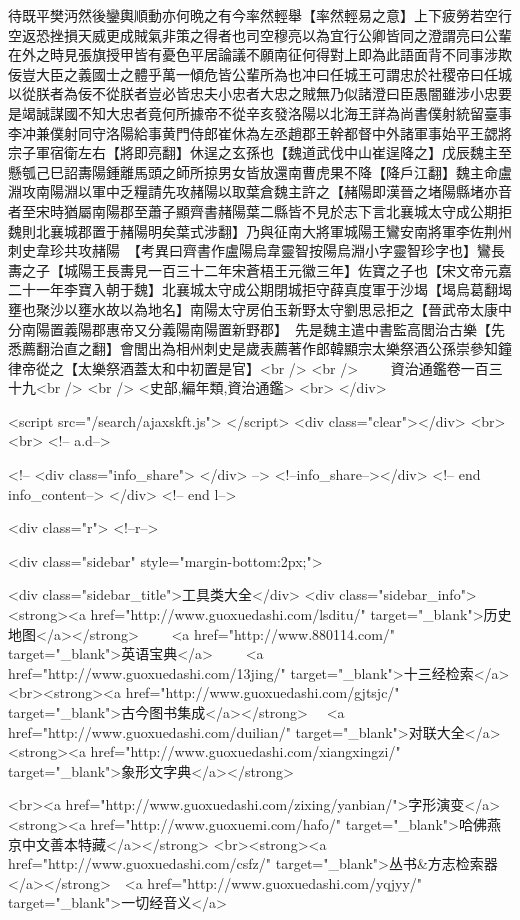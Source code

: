 待既平樊沔然後鑾輿順動亦何晩之有今率然輕舉【率然輕易之意】上下疲勞若空行空返恐挫損天威更成賊氣非策之得者也司空穆亮以為宜行公卿皆同之澄謂亮曰公輩在外之時見張旗授甲皆有憂色平居論議不願南征何得對上即為此語面背不同事涉欺佞豈大臣之義國士之體乎萬一傾危皆公輩所為也冲曰任城王可謂忠於社稷帝曰任城以從朕者為佞不從朕者豈必皆忠夫小忠者大忠之賊無乃似諸澄曰臣愚闇雖涉小忠要是竭誠謀國不知大忠者竟何所據帝不從辛亥發洛陽以北海王詳為尚書僕射統留臺事李冲兼僕射同守洛陽給事黄門侍郎崔休為左丞趙郡王幹都督中外諸軍事始平王勰將宗子軍宿衛左右【將即亮翻】休逞之玄孫也【魏道武伐中山崔逞降之】戊辰魏主至懸瓠己巳詔夀陽鍾離馬頭之師所掠男女皆放還南曹虎果不降【降戶江翻】魏主命盧淵攻南陽淵以軍中乏糧請先攻赭陽以取葉倉魏主許之【赭陽即漢晉之堵陽縣堵亦音者至宋時猶屬南陽郡至蕭子顯齊書赭陽葉二縣皆不見於志下言北襄城太守成公期拒魏則北襄城郡置于赭陽明矣葉式涉翻】乃與征南大將軍城陽王鸞安南將軍李佐荆州刺史韋珍共攻赭陽　【考異曰齊書作盧陽烏韋靈智按陽烏淵小字靈智珍字也】鸞長夀之子【城陽王長夀見一百三十二年宋蒼梧王元徽三年】佐寶之子也【宋文帝元嘉二十一年李寶入朝于魏】北襄城太守成公期閉城拒守薛真度軍于沙堨【堨烏葛翻堨壅也聚沙以壅水故以為地名】南陽太守房伯玉新野太守劉思忌拒之【晉武帝太康中分南陽置義陽郡惠帝又分義陽南陽置新野郡】　先是魏主遣中書監高閭治古樂【先悉薦翻治直之翻】會閭出為相州刺史是歲表薦著作郎韓顯宗太樂祭酒公孫崇參知鐘律帝從之【太樂祭酒蓋太和中初置是官】<br />
<br />
　　資治通鑑卷一百三十九<br />
<br />
<史部,編年類,資治通鑑>  <br>
   </div> 

<script src="/search/ajaxskft.js"> </script>
 <div class="clear"></div>
<br>
<br>
 <!-- a.d-->

 <!--
<div class="info_share">
</div> 
-->
 <!--info_share--></div>   <!-- end info_content-->
  </div> <!-- end l-->

<div class="r">   <!--r-->



<div class="sidebar"  style="margin-bottom:2px;">

 
<div class="sidebar_title">工具类大全</div>
<div class="sidebar_info">
<strong><a href="http://www.guoxuedashi.com/lsditu/" target="_blank">历史地图</a></strong>　　
<a href="http://www.880114.com/" target="_blank">英语宝典</a>　　
<a href="http://www.guoxuedashi.com/13jing/" target="_blank">十三经检索</a>　
<br><strong><a href="http://www.guoxuedashi.com/gjtsjc/" target="_blank">古今图书集成</a></strong>　
<a href="http://www.guoxuedashi.com/duilian/" target="_blank">对联大全</a>　<strong><a href="http://www.guoxuedashi.com/xiangxingzi/" target="_blank">象形文字典</a></strong>　

<br><a href="http://www.guoxuedashi.com/zixing/yanbian/">字形演变</a>　　<strong><a href="http://www.guoxuemi.com/hafo/" target="_blank">哈佛燕京中文善本特藏</a></strong>
<br><strong><a href="http://www.guoxuedashi.com/csfz/" target="_blank">丛书&方志检索器</a></strong>　<a href="http://www.guoxuedashi.com/yqjyy/" target="_blank">一切经音义</a>　　

